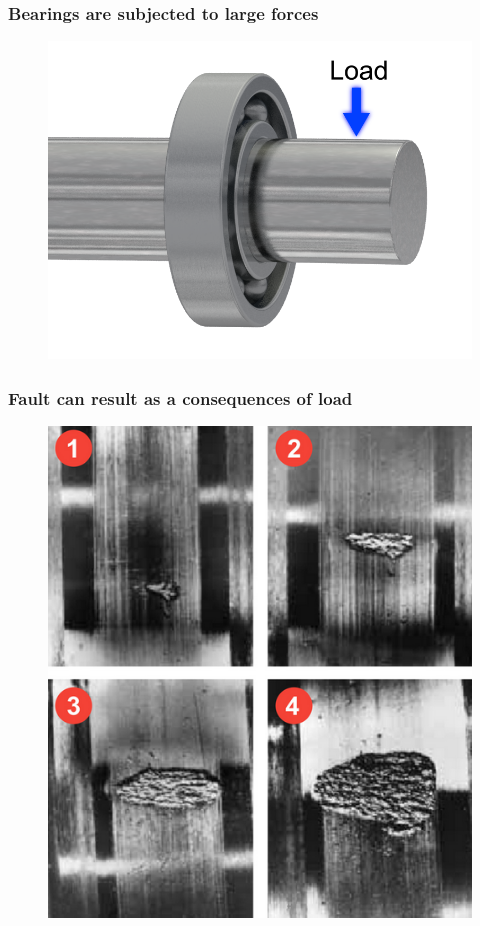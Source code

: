 \documentclass{beamer}
\begin{document}



\begin{frame}
	\frametitle{Bearings are subjected to large forces}
	\begin{figure}[H]
		\centering
		\includegraphics[width=0.8\linewidth]{bearing}
	\end{figure}
\end{frame}


\begin{frame}
	\frametitle{Fault can result as a consequences of load}
	\begin{figure}[H]
		\centering
		\includegraphics[width=0.6\linewidth]{bearing_fault_evolution}
	\end{figure}
\end{frame}
\end{document}
